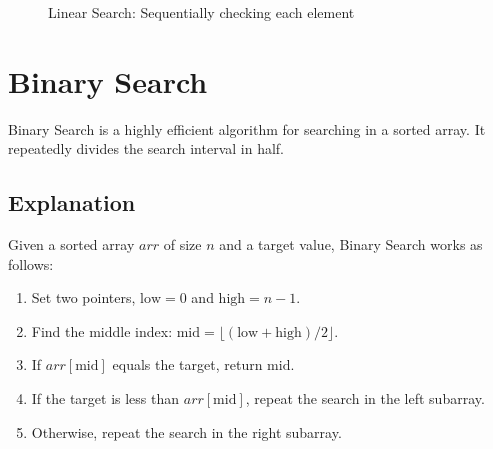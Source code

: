 \begin{figure}[H]
\centering
{}
\caption{Linear Search: Sequentially checking each element}
\end{figure}


\section{Binary Search}
Binary Search is a highly efficient algorithm for searching in a sorted array. It repeatedly divides the search interval in half.

\subsection{Explanation}
Given a sorted array \( arr \) of size \( n \) and a target value, Binary Search works as follows:
\begin{enumerate}
  \item Set two pointers, \( \text{low} = 0 \) and \( \text{high} = n-1 \).
  \item Find the middle index: \( \text{mid} = \lfloor (\text{low} + \text{high})/2 \rfloor \).
  \item If \( arr[\text{mid}] \) equals the target, return \( \text{mid} \).
  \item If the target is less than \( arr[\text{mid}] \), repeat the search in the left subarray.
  \item Otherwise, repeat the search in the right subarray.
\end{enumerate}

